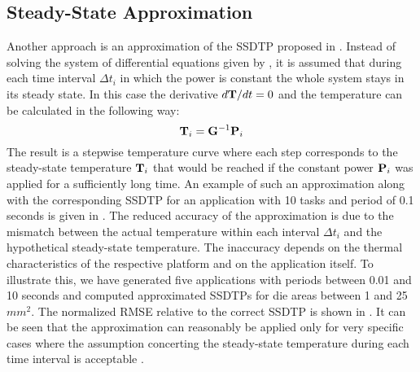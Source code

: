\subsection{Steady-State Approximation} \label{sec:steady-state-approximation}
Another approach is an approximation of the SSDTP proposed in \cite{huang2009}. Instead of solving the system of differential equations given by , it is assumed that during each time interval $\Delta t_i$ in which the power is constant the whole system stays in its steady state. In this case the derivative \mbox{$d\mathbf{T}/dt = 0$} and the temperature can be calculated in the following way:
\[
  \mathbf{T}_i = \mathbf{G}^{-1} \mathbf{P}_i
\]
The result is a stepwise temperature curve where each step corresponds to the steady-state temperature $\mathbf{T}_i$ that would be reached if the constant power $\mathbf{P}_i$ was applied for a sufficiently long time. An example of such an approximation along with the corresponding SSDTP for an application with 10 tasks and period of 0.1 seconds is given in . The reduced accuracy of the approximation is due to the mismatch between the actual temperature within each interval $\Delta t_i$ and the hypothetical steady-state temperature. The inaccuracy depends on the thermal characteristics of the respective platform and on the application itself. To illustrate this, we have generated five applications with periods between 0.01 and 10 seconds and computed approximated SSDTPs for die areas between 1 and 25 $mm^2$. The normalized RMSE relative to the correct SSDTP is shown in . It can be seen that the approximation can reasonably be applied only for very specific cases where the assumption concerting the steady-state temperature during each time interval is acceptable \cite{huang2009}.
